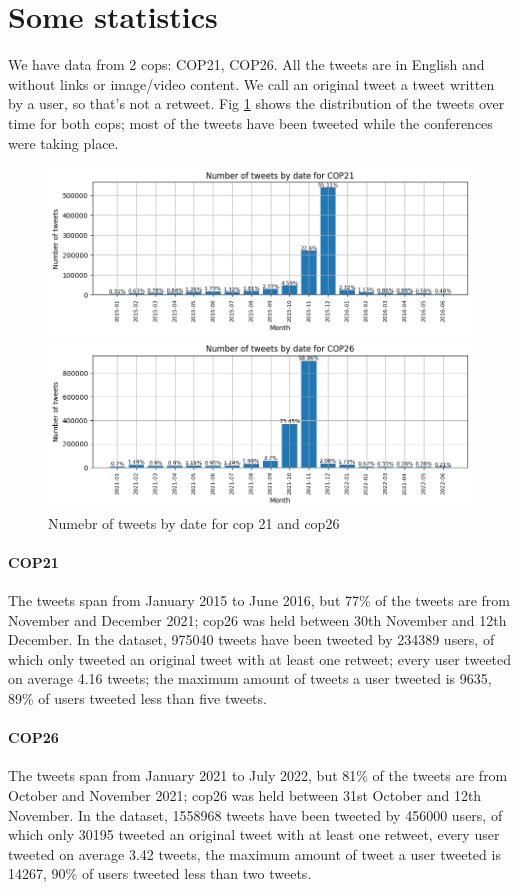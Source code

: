 \section{Some statistics}
We have data from 2 cops: COP21, COP26.
All the tweets are in English and without links or image/video content.
We call an original tweet a tweet written by a user, so that's not a retweet. Fig \ref{fig:tweets_by_date} shows the distribution of the tweets over time for both cops; most of the tweets have been tweeted while the conferences were taking place.

\begin{figure}[H]
    \centering
    \includegraphics[width=0.75\linewidth ]{Chapter3/figures/tweets_by_date_cop21.png}

    \includegraphics[width=0.75\linewidth ]{Chapter3/figures/tweets_by_date_cop26.png}
    \caption{Numebr of tweets by date for cop 21 and cop26}
    \label{fig:tweets_by_date}
\end{figure}

\paragraph{COP21}
The tweets span from January 2015 to June 2016, but 77\%  of the tweets are from November and December 2021; cop26 was held between 30th November and 12th December. In the dataset, 975040 tweets have been tweeted by 234389 users, of which only {} tweeted an original tweet with at least one retweet; every user tweeted on average 4.16 tweets; the maximum amount of tweets a user tweeted is 9635, 89\% of users tweeted less than five tweets.

\paragraph{COP26}
The tweets span from January 2021 to July 2022, but 81\%  of the tweets are from October and November 2021; cop26 was held between 31st October and 12th November. In the dataset, 1558968 tweets have been tweeted by 456000 users, of which only 30195 tweeted an original tweet with at least one retweet, every user tweeted on average 3.42 tweets, the maximum amount of tweet a user tweeted is 14267, 90\% of users tweeted less than two tweets.
\\


